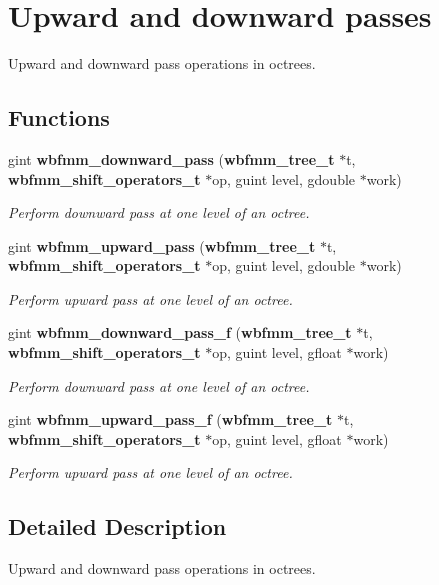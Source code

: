 \section{Upward and downward passes}
\label{group__pass}


Upward and downward pass operations in octrees.  


\subsection*{Functions}
\begin{DoxyCompactItemize}
\item 
gint {\bf wbfmm\+\_\+downward\+\_\+pass} ({\bf wbfmm\+\_\+tree\+\_\+t} $\ast$t, {\bf wbfmm\+\_\+shift\+\_\+operators\+\_\+t} $\ast$op, guint level, gdouble $\ast$work)
\begin{DoxyCompactList}\small\item\em Perform downward pass at one level of an octree. \end{DoxyCompactList}\item 
gint {\bf wbfmm\+\_\+upward\+\_\+pass} ({\bf wbfmm\+\_\+tree\+\_\+t} $\ast$t, {\bf wbfmm\+\_\+shift\+\_\+operators\+\_\+t} $\ast$op, guint level, gdouble $\ast$work)
\begin{DoxyCompactList}\small\item\em Perform upward pass at one level of an octree. \end{DoxyCompactList}\item 
gint {\bf wbfmm\+\_\+downward\+\_\+pass\+\_\+f} ({\bf wbfmm\+\_\+tree\+\_\+t} $\ast$t, {\bf wbfmm\+\_\+shift\+\_\+operators\+\_\+t} $\ast$op, guint level, gfloat $\ast$work)
\begin{DoxyCompactList}\small\item\em Perform downward pass at one level of an octree. \end{DoxyCompactList}\item 
gint {\bf wbfmm\+\_\+upward\+\_\+pass\+\_\+f} ({\bf wbfmm\+\_\+tree\+\_\+t} $\ast$t, {\bf wbfmm\+\_\+shift\+\_\+operators\+\_\+t} $\ast$op, guint level, gfloat $\ast$work)
\begin{DoxyCompactList}\small\item\em Perform upward pass at one level of an octree. \end{DoxyCompactList}\end{DoxyCompactItemize}


\subsection{Detailed Description}
Upward and downward pass operations in octrees. 



